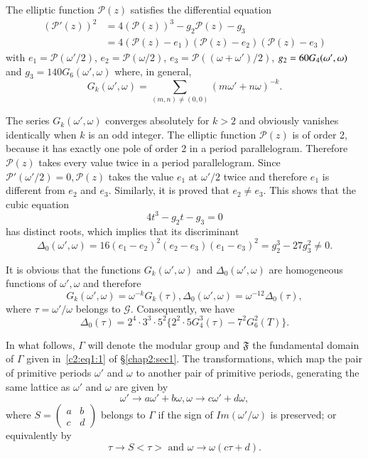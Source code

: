 The elliptic function $\mathscr{P}(z)$ satisfies the differential
equation 
\begin{align*}
(\mathscr{P}'(z))^2 & = 4(\mathscr{P}(z))^3 - g_2 \mathscr{P}(z) -
  g_3\\
& = 4 (\mathscr{P}(z) -e_1)(\mathscr{P}(z)-e_2) (\mathscr{P}(z)-e_3)
\end{align*}
with \pageoriginale $e_1=\mathscr{P}(\omega'/2)$,
$e_2=\mathscr{P}(\omega/2)$, $e_3=\mathscr{P}((\omega+\omega')/2)$,
$g_2=\break 60G_4(\omega',\omega)$ and $g_3=140G_6(\omega',\omega)$ where, in
general,
$$
G_k (\omega', \omega) = \sum_{(m,n)\neq (0,0)}
(m\omega'+n\omega)^{-k}. 
$$

The series $G_k(\omega',\omega)$ converges absolutely for $k>2$ and
obviously vanishes identically when $k$ is an odd integer. The
elliptic function $\mathscr{P}(z)$ is of order 2, because it has
exactly one pole of order 2 in a period parallelogram. Therefore
$\mathscr{P}(z)$ takes every value twice in a period
parallelogram. Since $\mathscr{P}'(\omega'/2)=0,\mathscr{P}(z)$ takes
the value $e_1$ at $\omega'/2$ twice and therefore $e_1$ is different
from $e_2$ and $e_3$. Similarly, it is proved that $e_2 \neq e_3$. This
shows that the cubic equation
$$
4t^3 - g_2 t - g_3 = 0
$$
has distinct roots, which implies that its discriminant
$$
\Delta_0 (\omega', \omega) = 16 (e_1-e_2)^2 (e_2 - e_3) (e_1-e_3)^2 =
g^3_2 - 27 g^2_3 \neq 0.
$$

It is obvious that the functions $G_k (\omega', \omega)$ and $\Delta_0
(\omega', \omega)$ are homogeneous functions of $\omega', \omega$ and
therefore 
$$
G_k (\omega',\omega) = \omega^{-k} G_k (\tau), \Delta_0
(\omega',\omega) = \omega^{-12} \Delta_0 (\tau),
$$
where $\tau=\omega'/\omega$ belongs to $\mathscr{G}$. Consequently, we
have 
\begin{equation*}
\Delta_0 (\tau)= 2^4\cdot 3^3 \cdot 5^2 \{2^2\cdot 5 G^3_4(\tau) -
7^2G^2_6(T)\}. \tag{1}\label{c2:eq4:1}
\end{equation*}

In what follows, $\Gamma$ will denote the modular group and
$\mathfrak{F}$ the fundamental domain of $\Gamma$ given in~\eqref{c2:eq1:1} of 
\S \ref{chap2:sec1}. The transformations, which map the pair of primitive periods
$\omega'$ and $\omega$ to another pair of primitive periods,
generating the same lattice as $\omega'$ and $\omega$ are given by 
$$
\omega' \longrightarrow a \omega' + b \omega, \omega \longrightarrow c
\omega' + d\omega, 
$$\pageoriginale
where $S = \left(\begin{smallmatrix}
  a&b\\c&d \end{smallmatrix}\right)$ belongs to $\Gamma$ if the sign
of $Im(\omega'/\omega)$ is preserved; or equivalently by 
$$
\tau \longrightarrow S <\tau> \text{ and } \omega \longrightarrow
\omega (c\tau+d).
$$

